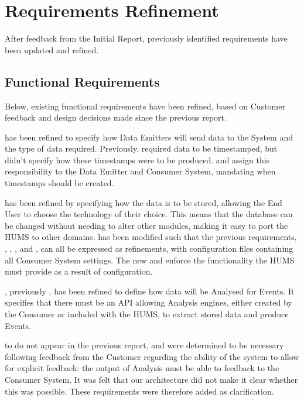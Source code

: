 \section{Requirements Refinement}
\label{sec:requirements}
After feedback from the Initial Report, previously identified requirements have been updated and refined.

\subsection{Functional Requirements}
\label{sec:requirements-functional}
Below, existing functional requirements have been refined, based on Customer 
feedback and design decisions made since the previous report.

 has been refined to specify how Data Emitters will send data to the System 
and the type of data required. Previously,
 required data to be timestamped, but didn't specify how these 
timestamps were to be produced.  and  assign this
responsibility to the Data Emitter and Consumer System, mandating when 
timestamps should be created.

 has been refined by specifying how the data is to be stored, allowing the End 
User to choose the technology of their choice. This means that the database can be 
changed without needing to alter other modules, making it easy to 
port the HUMS to other domains.
 has been modified such that the previous requirements, , , 
, and , can all be expressed as refinements, with 
configuration files containing all Consumer System settings. The new  and  
enforce the functionality the HUMS must provide as a result of configuration.

, previously , has been refined to define how data will be Analysed for 
Events. It specifies that there must be an API allowing Analysis engines, 
either created by the Consumer or included with the HUMS, to extract stored data
and produce Events. 

 to  do not appear in the previous report, and were determined 
to be necessary following feedback from the Customer regarding the ability 
of the system to allow for explicit feedback: the output of Analysis must be able to feedback to the Consumer System. 
It was felt that our architecture did not make it clear whether this was 
possible. These requirements were therefore added as clarification.

